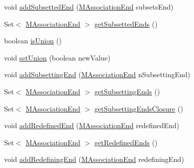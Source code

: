 \begin{DoxyCompactItemize}
\item 
void \hyperlink{classorg_1_1tzi_1_1use_1_1uml_1_1mm_1_1_m_association_end_a37c55105e918a4d1e2bb80d286604b47}{add\-Subsetted\-End} (\hyperlink{classorg_1_1tzi_1_1use_1_1uml_1_1mm_1_1_m_association_end}{M\-Association\-End} subsets\-End)
\item 
Set$<$ \hyperlink{classorg_1_1tzi_1_1use_1_1uml_1_1mm_1_1_m_association_end}{M\-Association\-End} $>$ \hyperlink{classorg_1_1tzi_1_1use_1_1uml_1_1mm_1_1_m_association_end_abb4263d2235e74b103791d55c71c9530}{get\-Subsetted\-Ends} ()
\item 
boolean \hyperlink{classorg_1_1tzi_1_1use_1_1uml_1_1mm_1_1_m_association_end_a852f69ebbab2e3ab26bfb290336cae0b}{is\-Union} ()
\item 
void \hyperlink{classorg_1_1tzi_1_1use_1_1uml_1_1mm_1_1_m_association_end_aeb428fba80dade9b43d767212c912dfd}{set\-Union} (boolean new\-Value)
\item 
void \hyperlink{classorg_1_1tzi_1_1use_1_1uml_1_1mm_1_1_m_association_end_a4041bf7fe73206da587fa75d70e20aad}{add\-Subsetting\-End} (\hyperlink{classorg_1_1tzi_1_1use_1_1uml_1_1mm_1_1_m_association_end}{M\-Association\-End} n\-Subsetting\-End)
\item 
Set$<$ \hyperlink{classorg_1_1tzi_1_1use_1_1uml_1_1mm_1_1_m_association_end}{M\-Association\-End} $>$ \hyperlink{classorg_1_1tzi_1_1use_1_1uml_1_1mm_1_1_m_association_end_a3e2621b4f31d1c8ad35dc287eae2bbc9}{get\-Subsetting\-Ends} ()
\item 
Set$<$ \hyperlink{classorg_1_1tzi_1_1use_1_1uml_1_1mm_1_1_m_association_end}{M\-Association\-End} $>$ \hyperlink{classorg_1_1tzi_1_1use_1_1uml_1_1mm_1_1_m_association_end_a846ddcf48c59f67ba6c456d96e205070}{get\-Subsetting\-Ends\-Closure} ()
\item 
void \hyperlink{classorg_1_1tzi_1_1use_1_1uml_1_1mm_1_1_m_association_end_a9c1c138b9bf51db53750b9b53d2b6d3d}{add\-Redefined\-End} (\hyperlink{classorg_1_1tzi_1_1use_1_1uml_1_1mm_1_1_m_association_end}{M\-Association\-End} redefined\-End)
\item 
Set$<$ \hyperlink{classorg_1_1tzi_1_1use_1_1uml_1_1mm_1_1_m_association_end}{M\-Association\-End} $>$ \hyperlink{classorg_1_1tzi_1_1use_1_1uml_1_1mm_1_1_m_association_end_a95eff2cb89222855fbd64033d283d502}{get\-Redefined\-Ends} ()
\item 
void \hyperlink{classorg_1_1tzi_1_1use_1_1uml_1_1mm_1_1_m_association_end_a98e989453483f0f856c50d15715562d9}{add\-Redefining\-End} (\hyperlink{classorg_1_1tzi_1_1use_1_1uml_1_1mm_1_1_m_association_end}{M\-Association\-End} redefining\-End)

\end{DoxyCompactItemize}
